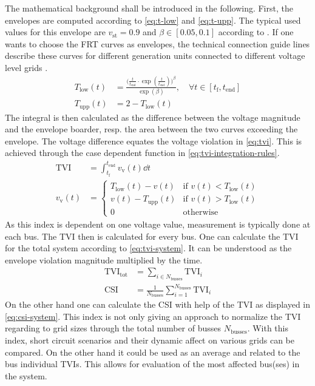 The mathematical background shall be introduced in the following.
First, the envelopes are computed according to \autoref{eq:t-low} and \autoref{eq:t-upp}.
The typical used values for this envelope are $v_\mathrm{st}=0.9$ and $\beta \in [0.05,0.1]$ according to \textcite{wildenhues_2015}.
If one wants to choose the \acs{FRT} curves as envelopes, the technical connection guide lines describe these curves for different generation units connected to different voltage level grids \autocite{vde-tar_2018,vde-tar_2023}.
\begin{align}
    T_\mathrm{low}(t) &= \frac{\bigg(\frac{t}{t_\mathrm{end}} \cdot \exp(\frac{t}{t_\mathrm{end}})\bigg)^\beta}{\exp(\beta)},\quad \forall t \in [t_\mathrm{f}, t_\mathrm{end}] \label{eq:t-low} \\[12pt]
    T_\mathrm{upp}(t) &= 2-T_\mathrm{low}(t) \label{eq:t-upp}
\end{align}
The integral is then calculated as the difference between the voltage magnitude and the envelope boarder, resp. the area between the two curves exceeding the envelope.
The voltage difference equates the voltage violation in \autoref{eq:tvi}.
This is achieved through the case dependent function in \autoref{eq:tvi-integration-rules}.
\begin{align}
    \text{TVI} &= \int_{t_\mathrm{f}}^{t_\mathrm{end}} v_\mathrm{v}(t) \dd{t} \label{eq:tvi}\\[12pt]
    v_\mathrm{v}(t) &= \begin{cases}
            T_\mathrm{low}(t) - v(t) & \text{if } v(t) < T_\mathrm{low}(t)\\
            v(t) - T_\mathrm{upp}(t) & \text{if } v(t) > T_\mathrm{low}(t)\\
            0 & \text{otherwise}
    \end{cases} \label{eq:tvi-integration-rules}
\end{align}
As this index is dependent on one voltage value, measurement is typically done at each bus.
The \acs{TVI} then is calculated for every bus.
One can calculate the \acs{TVI} for the total system according to \autoref{eq:tvi-system}.
It can be understood as the envelope violation magnitude multiplied by the time.
\begin{align}
    \text{TVI}_\mathrm{tot} &= \sum_{i \in N_\mathrm{busses}} \text{TVI}_i \label{eq:tvi-system} \\[12pt]
    \text{CSI} &= \frac{1}{N_\mathrm{busses}} \sum_{i=1}^{N_\mathrm{busses}} \text{TVI}_i \label{eq:csi-system}
\end{align}
On the other hand one can calculate the \ac{CSI} with help of the \acs{TVI} as displayed in \autoref{eq:csi-system}.
This index is not only giving an approach to normalize the \acs{TVI} regarding to grid sizes through the total number of busses $N_\mathrm{busses}$.
With this index, short circuit scenarios and their dynamic affect on various grids can be compared.
On the other hand it could be used as an average and related to the bus individual \acsp{TVI}.
This allows for evaluation of the most affected bus(ses) in the system.

